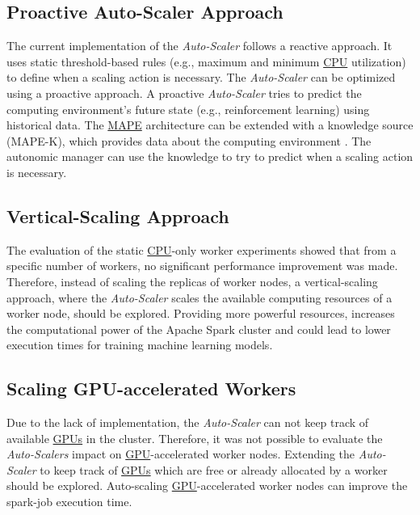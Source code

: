 \subsection{Proactive Auto-Scaler Approach}
The current implementation of the \textit{Auto-Scaler} follows a reactive approach. It uses static threshold-based rules (e.g., maximum and minimum \hyperlink{abbr:cpu}{CPU} utilization) to define when a scaling action is necessary.
The \textit{Auto-Scaler} can be optimized using a proactive approach. A proactive \textit{Auto-Scaler} tries to predict the computing environment's future state (e.g., reinforcement learning) using historical data.
The \hyperlink{abbr:mape}{MAPE} architecture can be extended with a knowledge source (MAPE-K), which provides data about the computing environment \cite{Sinreich2006AnAB}. The autonomic manager can use the knowledge to try to predict when a scaling action is necessary.


\subsection{Vertical-Scaling Approach}
The evaluation of the static \hyperlink{abbr:cpu}{CPU}-only worker experiments showed that from a specific number of workers, no significant performance improvement was made.
Therefore, instead of scaling the replicas of worker nodes, a vertical-scaling approach, where the \textit{Auto-Scaler} scales the available computing resources of a worker node, should be explored.
Providing more powerful resources, increases the computational power of the Apache Spark cluster and could lead to lower execution times for training machine learning models.


\subsection{Scaling GPU-accelerated Workers}
\label{subsec:08_outlook_gpus}
Due to the lack of implementation, the \textit{Auto-Scaler} can not keep track of available \hyperlink{abbr:gpu}{GPUs} in the cluster. Therefore, it was not possible to evaluate the \textit{Auto-Scalers} impact on \hyperlink{abbr:gpu}{GPU}-accelerated worker nodes.
Extending the \textit{Auto-Scaler} to keep track of \hyperlink{abbr:gpu}{GPUs} which are free or already allocated by a worker should be explored.
%
Auto-scaling \hyperlink{abbr:gpu}{GPU}-accelerated worker nodes can improve the spark-job execution time.


